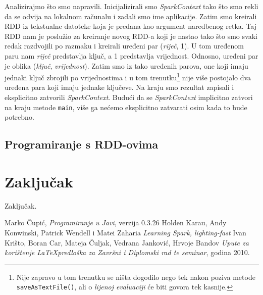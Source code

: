 \documentclass[times, utf8, zavrsni]{fer}
\begin{document}
\vspace{5mm}

Analizirajmo što smo napravili. Inicijalizirali smo \emph{SparkContext} tako što smo rekli da se odvija na lokalnom računalu i zadali smo ime aplikacije. Zatim smo kreirali RDD iz tekstualne datoteke koja je predana kao argument naredbenog retka. Taj RDD nam je poslužio za kreiranje novog RDD-a koji je nastao tako što smo svaki redak razdvojili po razmaku i kreirali uređeni par (\emph{riječ}, 1). U tom uređenom paru nam \emph{riječ} predstavlja ključ, a 1 predstavlja vrijednost. Odnosno, uređeni par je oblika (\emph{ključ}, \emph{vrijednost}). Zatim smo iz tako uređenih parova, one koji imaju jednaki ključ zbrojili po vrijednostima i u tom trenutku\footnote{Nije zapravo u tom trenutku se ništa dogodilo nego tek nakon poziva metode \texttt{saveAsTextFile()}, ali o \emph{lijenoj evaluaciji}  će biti govora tek kasnije.} nije više postojalo dva uređena para koji imaju jednake ključeve. Na kraju smo rezultat zapisali i eksplicitno zatvorili \emph{SparkContext}. Budući da se \emph{SparkContext} implicitno zatvori na kraju metode \texttt{main}, više ga nećemo eksplicitno zatvarati osim kada to bude potrebno.

\section{Programiranje s RDD-ovima}


\chapter{Zaključak}
Zaključak.

\begin{thebibliography}{9}
  Marko Čupić,
  \emph{Programiranje u Javi},
  verzija 0.3.26
  Holden Karau, Andy Konwinski, Patrick Wendell i Matei Zaharia
  \emph{Learning Spark, lighting-fast}
  Ivan Krišto, Boran Car, Mateja Čuljak, Vedrana Janković, Hrvoje Bandov
  \emph{Upute za korištenje \LaTeX predloška za Završni i Diplomski rad te seminar},
  godina 2010.
\end{thebibliography}
\end{document}
